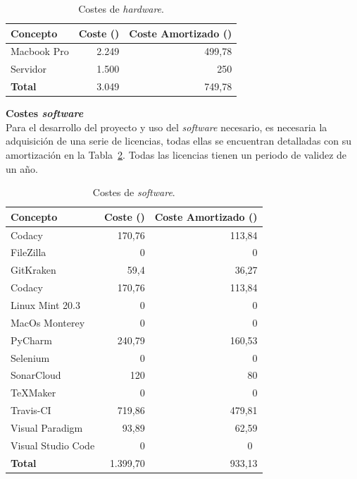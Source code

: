 \begin{table}[H]
\centering
\begin{tabular}{lrr}
	\toprule
	\textbf{Concepto} & \textbf{Coste (\officialeuro)} & \textbf{Coste Amortizado (\officialeuro)}\\
	\midrule
	Macbook Pro & 2.249 & 499,78\\
	Servidor & 1.500 & 250 \\
	\midrule
	\textbf{Total} & 3.049 & 749,78 \\
	\bottomrule
\end{tabular}
\caption{Costes de \emph{hardware}.}\label{tab:costes-hardware}
\end{table}

\textbf{Costes \textit{software}}\\
Para el desarrollo del proyecto y uso del \textit{software} necesario, es necesaria la adquisición de una serie de licencias, todas ellas se encuentran detalladas con su amortización en la Tabla~\ref{tab:costes-software}. Todas las licencias tienen un periodo de validez de un año.

\begin{table}[H]
\centering
\begin{tabular}{lrr}
	\toprule
	\textbf{Concepto} & \textbf{Coste (\officialeuro)} & \textbf{Coste Amortizado (\officialeuro)}\\
	\midrule
	Codacy & 170,76 & 113,84\\
	FileZilla & 0 & 0 \\
	GitKraken & 59,4& 36,27 \\
	Codacy & 170,76 & 113,84 \\
	Linux Mint 20.3 & 0 & 0 \\
	MacOs Monterey & 0 & 0 \\
	PyCharm & 240,79 & 160,53 \\
	Selenium & 0 & 0 \\
	SonarCloud & 120 & 80 \\
	\TeX Maker & 0 & 0 \\
	Travis-CI & 719,86 & 479,81 \\
	Visual Paradigm & 93,89 & 62,59 \\
	Visual Studio Code & 0 & 0~\\
	\midrule
	\textbf{Total} & 1.399,70 & 933,13 \\
	\bottomrule
\end{tabular}
\caption{Costes de \emph{software}.}\label{tab:costes-software}
\end{table}


